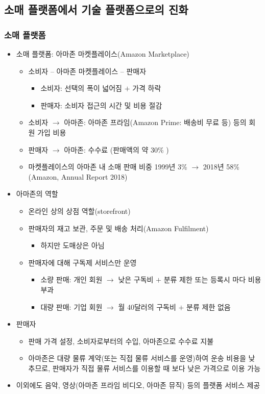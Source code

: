 \subsection{소매 플랫폼에서 기술 플랫폼으로의 진화}
\subsubsection{소매 플랫폼}
\begin{itemize}
\item 소매 플랫폼: 아마존 마켓플레이스(Amazon Marketplace)
	\begin{itemize}
	\item 소비자 -- 아마존 마켓플레이스 -- 판매자
		\begin{itemize}
		\item 소비자: 선택의 폭이 넓어짐 $+$ 가격 하락
		\item 판매자: 소비자 접근의 시간 및 비용 절감
		\end{itemize}
	\item 소비자 $\rightarrow$ 아마존: 아마존 프라임(Amazon Prime: 배송비 무료 등) 등의 회원 가입 비용
	\item 판매자 $\rightarrow$ 아마존: 수수료 (판매액의 약 30\% \citep{Mims:2018wy})	
	\item 마켓플레이스의 아마존 내 소매 판매 비중 1999년 3\% $\rightarrow$ 2018년 58\% (Amazon, Annual Report 2018)
	\end{itemize}
\item 아마존의 역할
	\begin{itemize}
	\item 온라인 상의 상점 역할(storefront)
	\item 판매자의 재고 보관, 주문 및 배송 처리(Amazon Fulfilment)
		\begin{itemize}
		\item 하지만 도매상은 아님
		\end{itemize}
	\item 판매자에 대해 구독제 서비스만 운영
		\begin{itemize}
		\item 소량 판매: 개인 회원 $\rightarrow$ 낮은 구독비 $+$ 분류 제한 또는 등록시 마다 비용 부과
		\item 대량 판매: 기업 회원 $\rightarrow$ 월 40달러의 구독비 $+$ 분류 제한 없음
		\end{itemize}
	\end{itemize}
\item 판매자
	\begin{itemize}
	\item 판매 가격 설정, 소비자로부터의 수입, 아마존으로 수수료 지불
	\item 아마존은 대량 물류 계약(또는 직접 물류 서비스를 운영)하여 운송 비용을 낮추므로, 판매자가 직접 물류 서비스를 이용할 때 보다 낮은 가격으로 이용 가능
	\end{itemize}
\item 이외에도 음악, 영상(아마존 프라임 비디오, 아마존 뮤직) 등의 플랫폼 서비스 제공
\end{itemize}

